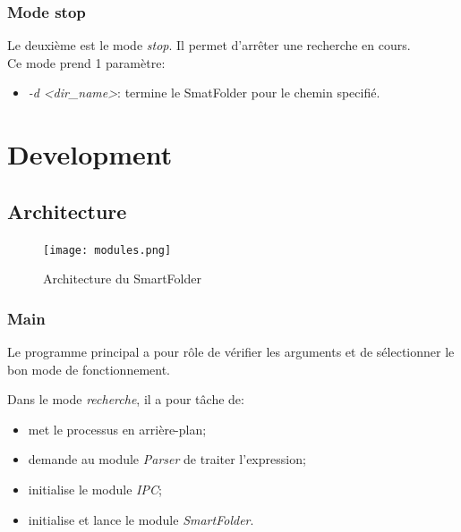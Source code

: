 \documentclass[11pt, a4paper]{article}
\begin{document}
\subsubsection{Mode stop}
Le deuxième est le mode \textit{stop}.
Il permet d'arrêter une recherche en cours. \\

Ce mode prend 1 paramètre:
\begin{itemize}
	\renewcommand\labelitemi{}
    \item \textit{-d} \textit{<dir\_name>}: termine le SmatFolder pour le chemin specifié.
\end{itemize}

\newpage

\section{Development}
\subsection{Architecture}

\begin{figure}[H]
    \begin{center}
        \texttt{[image: modules.png]}
    \end{center}
    \caption{Architecture du SmartFolder}
    \label{Architecture du SmartFolder}
\end{figure}

\subsubsection{Main}

Le programme principal a pour rôle de vérifier les arguments et de sélectionner le bon mode de fonctionnement.

Dans le mode \textit{recherche}, il a pour tâche de:
\begin{itemize}
    \item met le processus en arrière-plan;
    \item demande au module \textit{Parser} de traiter l'expression;
    \item initialise le module \textit{IPC};
    \item initialise et lance le module \textit{SmartFolder}.\\
\end{itemize}
\end{document}

